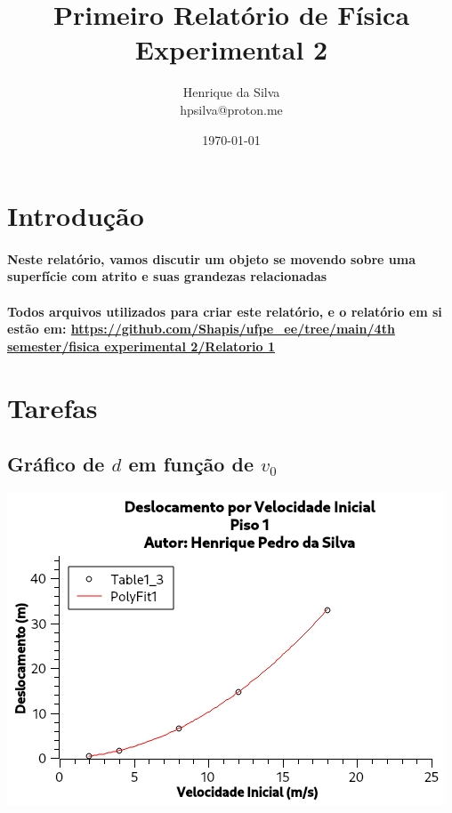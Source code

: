 \documentclass[12pt,twoside, a4paper, twocolumn]{article}
\title{Primeiro Relatório de Física Experimental 2}
\author{Henrique da Silva \\ hpsilva@proton.me}
\date{\today}
\begin{document}
\maketitle
{}
\newpage
\tableofcontents
\newpage

\section{Introdução}

\paragraph*{Neste relatório, vamos discutir um objeto se movendo sobre uma superfície com atrito e suas grandezas relacionadas}

\paragraph*{Todos arquivos utilizados para criar este relatório, e o relatório em si estão em:  \url{https://github.com/Shapis/ufpe_ee/tree/main/4th semester/fisica experimental 2/Relatorio 1}}

\section{Tarefas}

\subsection{Gráfico de $d$ em função de $v_0$}



\begin{adjustbox}{scale=0.75}
    \includegraphics{Grafico-0.jpg}
\end{adjustbox}
\end{document}
